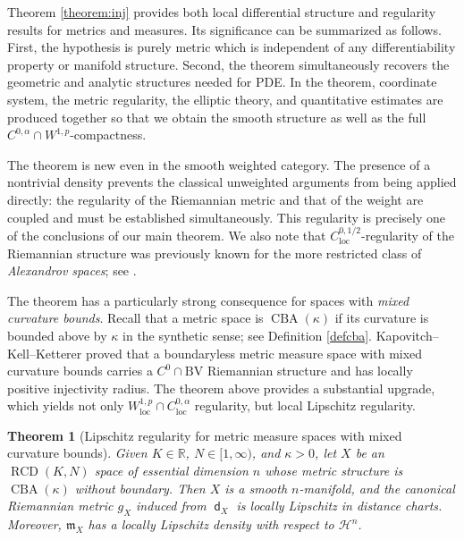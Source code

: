 \documentclass[11pt,reqno]{amsart}
\newtheorem{theorem}{Theorem}[section]
\theoremstyle{definition}
\numberwithin{equation}{section}
\newcommand{\dR}{\mathbb{R}}
\newcommand{\meas}{\mathfrak{m}}
\DeclareMathOperator{\CBA}{CBA}
\DeclareMathOperator{\dist}{\mathsf{d}}
\DeclareMathOperator{\loc}{loc}
\DeclareMathOperator{\RCD}{RCD}
\newcommand{\haus}{\mathscr{H}}
\begin{document}
Theorem \ref{theorem:inj} provides both local differential structure and regularity results for metrics and measures. Its significance can be summarized as follows.
First, the hypothesis is purely metric which is independent of any differentiability property or manifold structure. Second, the theorem simultaneously recovers the geometric and analytic structures needed for PDE.  In the theorem, coordinate system, the metric regularity, the elliptic theory, and quantitative estimates are produced together so that we obtain the smooth structure as well as the full $C^{0,\alpha} \cap W^{1,p}$-compactness.


The theorem is new even in the smooth weighted category. The presence of a nontrivial density prevents the classical unweighted arguments from being applied directly: the regularity of the Riemannian metric and that of the weight are coupled and must be established simultaneously. This  regularity is precisely one of the conclusions of our main theorem.
We also note that $C^{0, 1/2}_{\loc}$-regularity of the Riemannian structure was previously known for the more restricted class of \textit{Alexandrov spaces}; see \cite{Bere, OS}. 

\medskip


The theorem has a particularly strong consequence for spaces with \emph{mixed curvature bounds}. Recall that a metric space is $\CBA(\kappa)$ if its curvature is bounded above by $\kappa$ in the synthetic sense; see Definition \ref{defcba}. Kapovitch--Kell--Ketterer \cite{KKK} proved that a boundaryless metric measure space with mixed curvature bounds carries a $C^0\cap\mathrm{BV}$ Riemannian structure and has locally positive injectivity radius.  The theorem above provides a substantial upgrade, which
yields not only $W^{1,p}_{\loc}\cap C^{0,\alpha}_{\loc}$ regularity, but local Lipschitz regularity.



\begin{theorem}
[Lipschitz regularity for metric measure spaces with mixed curvature bounds]\label{thmmixed}
Given $K\in \dR$, $N \in [1, \infty)$, and $\kappa > 0$, let $X$ be an $\RCD(K,N)$ space of essential dimension $n$ whose metric structure is $\CBA(\kappa)$ without boundary. Then $X$ is a smooth $n$-manifold, and the canonical Riemannian metric $g_X$ induced from $\dist_X$ is locally Lipschitz in distance charts. 
Moreover, $\meas_X$ has a locally Lipschitz density   with respect to $\haus^n$.
\end{theorem}
\end{document}
